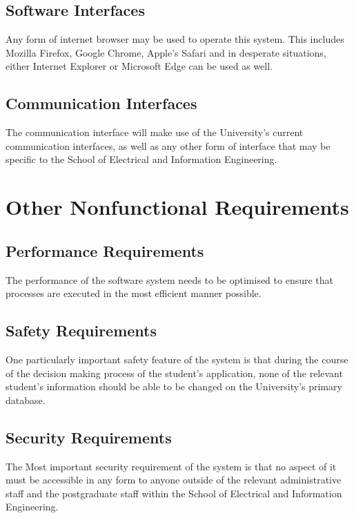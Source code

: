 \documentclass[journal,comsoc,onecolumn]{IEEEtran}
\begin{document}
\subsection{Software Interfaces}
Any form of internet browser may be used to operate this system. This includes Mozilla Firefox, Google Chrome, Apple's Safari and in desperate situations, either Internet Explorer or Microsoft Edge can be used as well.

\subsection{Communication Interfaces}
The communication interface will make use of the University's current communication interfaces, as well as any other form of interface that may be specific to the School of Electrical and Information Engineering.

\pagebreak


\section{Other Nonfunctional Requirements}

\subsection{Performance Requirements}
The performance of the software system needs to be optimised to ensure that processes are executed in the most efficient manner possible.

\subsection{Safety Requirements}
One particularly important safety feature of the system is that during the course of the decision making process of the student's application, none of the relevant student's information should be able to be changed on the University's primary database.

\subsection{Security Requirements}
The Most important security requirement of the system is that no aspect of it must be accessible in any form to anyone outside of the relevant administrative staff and the postgraduate staff within the School of Electrical and Information Engineering.
\end{document}
